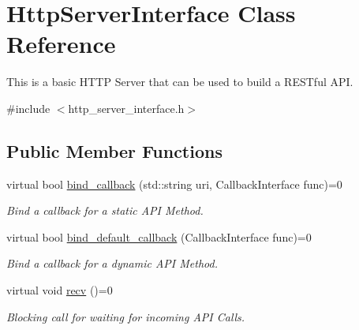 \hypertarget{classHttpServerInterface}{\section{Http\-Server\-Interface Class Reference}
\label{classHttpServerInterface}
}


This is a basic H\-T\-T\-P Server that can be used to build a R\-E\-S\-Tful A\-P\-I.  




{\ttfamily \#include $<$http\-\_\-server\-\_\-interface.\-h$>$}

\subsection*{Public Member Functions}
\begin{DoxyCompactItemize}
\item 
\hypertarget{classHttpServerInterface_a6aa54efaf6f176d985c7faa57e1aa7fd}{virtual bool \hyperlink{classHttpServerInterface_a6aa54efaf6f176d985c7faa57e1aa7fd}{bind\-\_\-callback} (std\-::string uri, Callback\-Interface func)=0}\label{classHttpServerInterface_a6aa54efaf6f176d985c7faa57e1aa7fd}

\begin{DoxyCompactList}\small\item\em Bind a callback for a static A\-P\-I Method. \end{DoxyCompactList}\item 
\hypertarget{classHttpServerInterface_a398064a0d7fb0c7e52d94ccfcbb6d89a}{virtual bool \hyperlink{classHttpServerInterface_a398064a0d7fb0c7e52d94ccfcbb6d89a}{bind\-\_\-default\-\_\-callback} (Callback\-Interface func)=0}\label{classHttpServerInterface_a398064a0d7fb0c7e52d94ccfcbb6d89a}

\begin{DoxyCompactList}\small\item\em Bind a callback for a dynamic A\-P\-I Method. \end{DoxyCompactList}\item 
\hypertarget{classHttpServerInterface_a350f4321505079d9c440ce4a4372044f}{virtual void \hyperlink{classHttpServerInterface_a350f4321505079d9c440ce4a4372044f}{recv} ()=0}\label{classHttpServerInterface_a350f4321505079d9c440ce4a4372044f}

\begin{DoxyCompactList}\small\item\em Blocking call for waiting for incoming A\-P\-I Calls. \end{DoxyCompactList}\end{DoxyCompactItemize}


